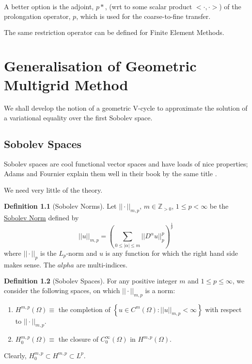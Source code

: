 \documentclass[a4paper,10pt,oneside]{book}
\theoremstyle{plain}%
\theoremstyle{definition}
\newtheorem{defn}{Definition}[section]
\theoremstyle{remark}
\newcommand{\bbZ}{\mathbb{Z}}
\begin{document}
A better option is the adjoint, $p*$, (wrt to some scalar product
$<\cdot,\cdot>$) of the prolongation operator, $p$, which is used for the
coarse-to-fine transfer.

The same restriction operator can be defined for Finite Element Methods.

\chapter{Generalisation of Geometric Multigrid Method}
We shall develop the notion of a geometric V-cycle to approximate the solution
of a variational equality over the first Sobolev space.
\section{Sobolev Spaces}
Sobolev spaces are cool functional vector spaces and have loads of nice
properties; Adams and Fournier explain them well in their book by the same title
\cite{Adams03}.

We need very little of the theory.
\begin{defn}[Sobolev Norms]
 Let $||\cdot||_{m,p}$, $m\in\bbZ_{>0}$, $1\leq p<\infty$ be the
\underline{Sobolev Norm} defined by
 \begin{equation}
  ||u||_{m,p} = \left(\sum_{0\leq|\alpha|\leq m} ||D^\alpha
u||_p^p\right)^{\frac{1}{p}}
 \end{equation}
 where $||\cdot||_p$ is the $L_p$-norm and $u$ is any function for which the
right hand side makes sense. The $alpha$ are multi-indices.
\end{defn}

\begin{defn}[Sobolev Spaces]
 For any positive integer $m$ and $1\leq p\leq \infty$, we consider the
following spaces, on which $||\cdot||_{m,p}$ is a norm:
 \begin{enumerate}
  \item $H^{m,p}(\Omega)\equiv$ the completion of $\left\{u\in
C^m(\Omega):||u||_{m,p}<\infty\right\}$ with respect to $||\cdot||_{m,p}$.
  \item $H^{m,p}_0(\Omega)\equiv$ the closure of $C_0^\infty(\Omega)$ in
$H^{m,p}(\Omega)$.
 \end{enumerate}
\end{defn}

Clearly, $H^{m,p}_0\subset H^{m,p}\subset L^p$.
\end{document}
